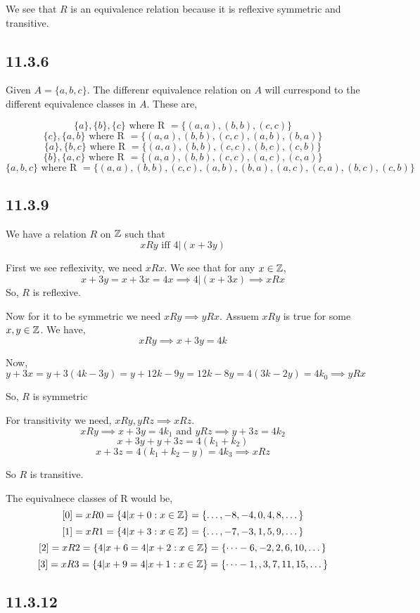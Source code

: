 \documentclass[a4paper]{report}
\begin{document}
We see that $R$ is an equivalence relation because it is reflexive symmetric and transitive.


\subsection*{11.3.6}
Given $A = \{a,b,c\}$. The differenr equivalence relation on $A$ will currespond to the different equivalence classes in $A$. These are, 

$$ \{a\}, \{b\}, \{c\} \text{ where R } = \{(a,a),(b,b),(c,c)\}$$ 
$$ \{c\}, \{a,b\}\text{ where R } = \{(a,a),(b,b),(c,c),(a,b),(b,a)\}$$ 
$$ \{a\},\{b,c\}\text{ where R } = \{(a,a),(b,b),(c,c), (b,c),(c,b)\}$$ 
$$  \{b\},\{a,c\}\text{ where R } = \{(a,a),(b,b),(c,c),(a,c),(c,a)\}$$ 
$$ \{a,b,c\}\text{ where R } = \{(a,a),(b,b),(c,c),(a,b),(b,a),(a,c),(c,a),(b,c),(c,b)\}$$ 


\subsection*{11.3.9}
We have a relation $R$ on $\mathbb{Z}$ such that 
$$ xRy \text{ iff } 4 | (x + 3y)$$ 

First we see reflexivity, we need $xRx$. We see that for any $x \in \mathbb{Z}$, 
$$ x + 3y = x + 3x = 4x \implies 4 | (x + 3x) \implies xRx $$ 
So, $R$ is reflexive.

Now for it to be symmetric we need $xRy \implies yRx$. Assuem $xRy$ is true for some $x,y \in \mathbb{Z}$. We have, 
$$ xRy \implies  x + 3y = 4k $$ 

Now, $$y + 3x = y + 3(4k - 3y) = y + 12k - 9y = 12k - 8y = 4(3k - 2y) = 4k_0 \implies yRx$$

So, $R$ is symmetric

For transitivity we need, $xRy, yRz \implies xRz$. 
$$ xRy  \implies x + 3y = 4k_1 \text{ and } yRz \implies y + 3z = 4k_2$$ 
$$  x + 3y + y + 3z = 4(k_1 + k_2)$$ 
$$ x + 3z  = 4(k_1 +k_2 - y) = 4k_3 \implies xRz $$ 

So $R$ is transitive.


The equivalnece classes of R would be, 
$$ [0] =  xR0 = \{4 | x + 0:x \in \mathbb{Z}\} = \{\dots, -8,-4,0,4,8,\dots\} $$ 
$$ [1] =  xR1 = \{4 | x + 3:x \in \mathbb{Z}\} = \{\dots,-7, -3, 1, 5, 9,\dots\} $$ 
$$ [2] =  xR2 = \{4 | x + 6 = 4 | x + 2:x \in \mathbb{Z}\} = \{\dots-6,-2,2,6,10,\dots\} $$ 
$$ [3] =  xR3 = \{4 | x + 9 = 4 | x + 1:x \in \mathbb{Z}\} = \{\dots-1,,3,7,11,15,\dots\} $$ 


\subsection*{11.3.12}
\end{document}
